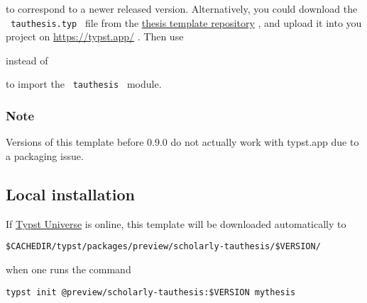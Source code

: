 \begin{Shaded}
\begin{Highlighting}[]
\end{Highlighting}
\end{Shaded}

to correspond to a newer released version. Alternatively, you could
download the \texttt{\ tauthesis.typ\ } file from the
\href{https://gitlab.com/tuni-official/thesis-templates/tau-typst-thesis-template}{thesis
template repository} , and upload it into you project on
\url{https://typst.app/} . Then use

\begin{Shaded}
\begin{Highlighting}[]
\end{Highlighting}
\end{Shaded}

instead of

\begin{Shaded}
\begin{Highlighting}[]
\end{Highlighting}
\end{Shaded}

to import the \texttt{\ tauthesis\ } module.

\subsubsection{Note}\label{note}

Versions of this template before 0.9.0 do not actually work with
typst.app due to a packaging issue.

\subsection{Local installation}\label{local-installation}

If \href{https://typst.app/universe}{Typst Universe} is online, this
template will be downloaded automatically to

\begin{verbatim}
$CACHEDIR/typst/packages/preview/scholarly-tauthesis/$VERSION/
\end{verbatim}

when one runs the command

\begin{verbatim}
typst init @preview/scholarly-tauthesis:$VERSION mythesis
\end{verbatim}

